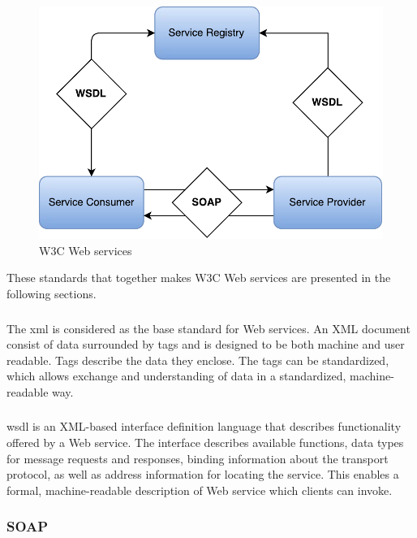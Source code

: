 \begin{figure}[h]
\centering
\includegraphics[scale=0.6]{images/web_services.pdf}
\caption{W3C Web services}
\label{figure-w3c-web-services}
\end{figure}

These standards that together makes W3C Web services are presented in the
following sections.

\subsubsection{}

The \gls{xml}\cite{W3C-XML} is considered as the base standard for Web services.
An XML document consist of data surrounded by tags and is designed to be both
machine and user readable. Tags describe the data they enclose. The tags can be
standardized, which allows exchange and understanding of data in a standardized,
machine-readable way.


\subsubsection{}

\gls{wsdl} is an XML-based interface definition language that describes
functionality offered by a Web service\cite{w3c-wsdl}. The interface describes
available functions, data types for message requests and responses, binding
information about the transport protocol, as well as address information for
locating the service. This enables a formal, machine-readable description of Web
service which clients can invoke.

\subsubsection{SOAP}

